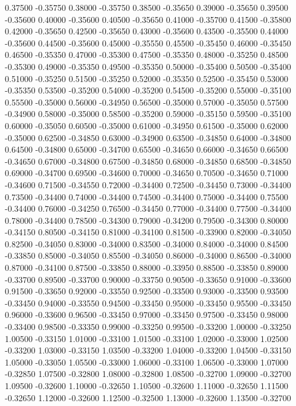 {0.37500 -0.35750
0.38000 -0.35750
0.38500 -0.35650
0.39000 -0.35650
0.39500 -0.35600
0.40000 -0.35600
0.40500 -0.35650
0.41000 -0.35700
0.41500 -0.35800
0.42000 -0.35650
0.42500 -0.35650
0.43000 -0.35600
0.43500 -0.35500
0.44000 -0.35600
0.44500 -0.35600
0.45000 -0.35550
0.45500 -0.35450
0.46000 -0.35450
0.46500 -0.35350
0.47000 -0.35300
0.47500 -0.35350
0.48000 -0.35250
0.48500 -0.35300
0.49000 -0.35350
0.49500 -0.35350
0.50000 -0.35400
0.50500 -0.35400
0.51000 -0.35250
0.51500 -0.35250
0.52000 -0.35350
0.52500 -0.35450
0.53000 -0.35350
0.53500 -0.35200
0.54000 -0.35200
0.54500 -0.35200
0.55000 -0.35100
0.55500 -0.35000
0.56000 -0.34950
0.56500 -0.35000
0.57000 -0.35050
0.57500 -0.34900
0.58000 -0.35000
0.58500 -0.35200
0.59000 -0.35150
0.59500 -0.35100
0.60000 -0.35050
0.60500 -0.35000
0.61000 -0.34950
0.61500 -0.35000
0.62000 -0.35000
0.62500 -0.34850
0.63000 -0.34900
0.63500 -0.34850
0.64000 -0.34800
0.64500 -0.34800
0.65000 -0.34700
0.65500 -0.34650
0.66000 -0.34650
0.66500 -0.34650
0.67000 -0.34800
0.67500 -0.34850
0.68000 -0.34850
0.68500 -0.34850
0.69000 -0.34700
0.69500 -0.34600
0.70000 -0.34650
0.70500 -0.34650
0.71000 -0.34600
0.71500 -0.34550
0.72000 -0.34400
0.72500 -0.34450
0.73000 -0.34400
0.73500 -0.34400
0.74000 -0.34400
0.74500 -0.34400
0.75000 -0.34400
0.75500 -0.34400
0.76000 -0.34250
0.76500 -0.34450
0.77000 -0.34400
0.77500 -0.34400
0.78000 -0.34400
0.78500 -0.34300
0.79000 -0.34200
0.79500 -0.34300
0.80000 -0.34150
0.80500 -0.34150
0.81000 -0.34100
0.81500 -0.33900
0.82000 -0.34050
0.82500 -0.34050
0.83000 -0.34000
0.83500 -0.34000
0.84000 -0.34000
0.84500 -0.33850
0.85000 -0.34050
0.85500 -0.34050
0.86000 -0.34000
0.86500 -0.34000
0.87000 -0.34100
0.87500 -0.33850
0.88000 -0.33950
0.88500 -0.33850
0.89000 -0.33700
0.89500 -0.33700
0.90000 -0.33750
0.90500 -0.33650
0.91000 -0.33600
0.91500 -0.33650
0.92000 -0.33550
0.92500 -0.33500
0.93000 -0.33500
0.93500 -0.33450
0.94000 -0.33550
0.94500 -0.33450
0.95000 -0.33450
0.95500 -0.33450
0.96000 -0.33600
0.96500 -0.33450
0.97000 -0.33450
0.97500 -0.33450
0.98000 -0.33400
0.98500 -0.33350
0.99000 -0.33250
0.99500 -0.33200
1.00000 -0.33250
1.00500 -0.33150
1.01000 -0.33100
1.01500 -0.33100
1.02000 -0.33000
1.02500 -0.33200
1.03000 -0.33150
1.03500 -0.33200
1.04000 -0.33200
1.04500 -0.33150
1.05000 -0.33050
1.05500 -0.33000
1.06000 -0.33100
1.06500 -0.33000
1.07000 -0.32850
1.07500 -0.32800
1.08000 -0.32800
1.08500 -0.32700
1.09000 -0.32700
1.09500 -0.32600
1.10000 -0.32650
1.10500 -0.32600
1.11000 -0.32650
1.11500 -0.32650
1.12000 -0.32600
1.12500 -0.32500
1.13000 -0.32600
1.13500 -0.32700
}
